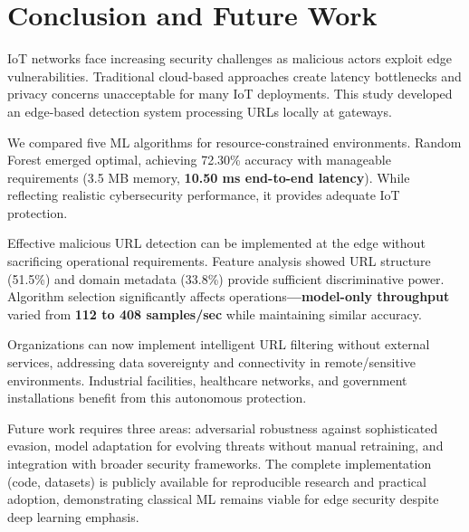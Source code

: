 \documentclass[conference]{IEEEtran}
\begin{document}
\section{Conclusion and Future Work}

IoT networks face increasing security challenges as malicious actors exploit edge vulnerabilities. Traditional cloud-based approaches create latency bottlenecks and privacy concerns unacceptable for many IoT deployments. This study developed an edge-based detection system processing URLs locally at gateways.

We compared five ML algorithms for resource-constrained environments. Random Forest emerged optimal, achieving 72.30\% accuracy with manageable requirements (3.5 MB memory, \textbf{10.50 ms end-to-end latency}). While reflecting realistic cybersecurity performance, it provides adequate IoT protection.

Effective malicious URL detection can be implemented at the edge without sacrificing operational requirements. Feature analysis showed URL structure (51.5\%) and domain metadata (33.8\%) provide sufficient discriminative power. Algorithm selection significantly affects operations\textbf{—model-only throughput} varied from \textbf{112 to 408 samples/sec} while maintaining similar accuracy.

Organizations can now implement intelligent URL filtering without external services, addressing data sovereignty and connectivity in remote/sensitive environments. Industrial facilities, healthcare networks, and government installations benefit from this autonomous protection.

Future work requires three areas: adversarial robustness against sophisticated evasion, model adaptation for evolving threats without manual retraining, and integration with broader security frameworks. The complete implementation (code, datasets) is publicly available for reproducible research and practical adoption, demonstrating classical ML remains viable for edge security despite deep learning emphasis.




\end{document}
